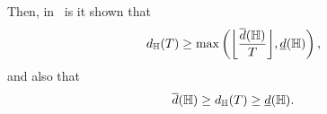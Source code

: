 Then, in~\citet{baxter2000model} is it shown that
\begin{equation}
    \nonumber
    d_\hypspacef(\ntasks) \geq \max\left(\floor*{\frac{\overline{d}(\hypspacef)}{\ntasks}}, \underline{d}(\hypspacef) \right) ,
\end{equation}
and also that 
\begin{equation}
    \label{eq:genvc_inequalities}
    \overline{d}(\hypspacef) \geq  d_\hypspacef(\ntasks)\geq \underline{d}(\hypspacef).
\end{equation}
        

